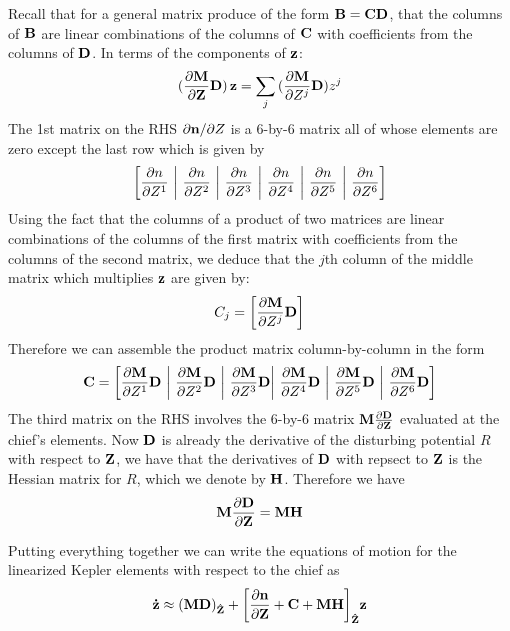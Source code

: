 Recall that for a general matrix produce of the form ${\bf B} = {\bf C D}$, that the columns of $\bf B$ are linear combinations of the columns of $\bf C$ with coefficients from the columns
of $\bf D$. In terms of the components of $\bf z$: $$({\partial  {\bf M}\over \partial {\bf Z}} {\bf D})\,  {\bf z} = \sum_j\, ({\partial {\bf M}\over \partial Z^j} {\bf D}) z^j$$
The 1st matrix on the RHS ${\partial {\bf n}/ \partial Z}$ is a 6-by-6 matrix all of whose elements are zero except the last row which is given by
$$\bigg[ {\partial n\over \partial Z^1} ~ \bigg| ~{\partial n\over \partial Z^2} ~ \bigg| ~{\partial n\over \partial Z^3} ~ \bigg| ~{\partial n\over \partial Z^4} ~ \bigg| ~{\partial n\over \partial Z^5} ~ \bigg| ~{\partial n\over \partial Z^6} \bigg]$$
Using the fact that the columns
of a product of two matrices are linear combinations of the columns of the first matrix with coefficients from the columns of the second matrix, we deduce that the $j$th column of the 
middle matrix which multiplies $\bf z$ are given by: 
$$C_j = \bigg[{\partial {\bf M}\over \partial Z^j} {\bf D}\bigg]$$Therefore we can assemble the product matrix column-by-column in the form
$${\bf C} = \bigg[{\partial {\bf M}\over \partial Z^1} {\bf D} ~\bigg| ~{\partial {\bf M}\over \partial Z^2} {\bf D} ~\bigg|~ {\partial {\bf M}\over \partial Z^3} {\bf D} \bigg|~ 
                           {\partial {\bf M}\over \partial Z^4} {\bf D} ~\bigg|~ {\partial {\bf M}\over \partial Z^5} {\bf D} ~\bigg|~{\partial {\bf M}\over \partial Z^6} {\bf D} \bigg]$$
The third matrix on the RHS involves the 6-by-6 matrix ${\bf M} {\partial {\bf D}\over\partial {\bf Z}}$ evaluated at the chief's elements. Now $\bf D$ is already the derivative of the disturbing potential $R$ with respect to $\bf Z$, we have that the derivatives of $\bf D$ with repsect to $\bf Z$ is the Hessian matrix for $R$, which we denote by $\bf H$. Therefore we have 
$${\bf M}{\partial {\bf D}\over \partial {\bf Z}} =  {\bf M H}$$
                           
Putting everything together we can write the equations of motion for the linearized Kepler elements with respect to the chief as 
\begin{align*}{\bf \dot z} \approx ({\bf M D})_{\bf \hat{Z}} + \bigg[ {\partial  {\bf n} \over \partial {\bf Z}}   + {\bf C}  + {\bf M H} \bigg]_{\bf \hat{Z}} {\bf z}\end{align*}

 



